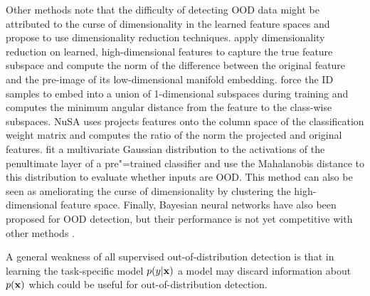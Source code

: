 Other methods note that the difficulty of detecting OOD data might be attributed to the curse of dimensionality in the learned feature spaces and propose to use dimensionality reduction techniques. \textcite{ndiour_outofdistribution_2020} apply dimensionality reduction on learned, high-dimensional features to capture the true feature subspace and compute the norm of the difference between the original feature and the pre-image of its low-dimensional manifold embedding. 
\textcite{zaeemzadeh_outofdistribution_2021} force the ID samples to embed into a union of 1-dimensional subspaces during training and computes the minimum angular distance from the feature to the class-wise subspaces. 
NuSA \parencite{cook_outlier_2020} uses projects features onto the column space of the classification weight matrix and computes the ratio of the norm the projected and original features.
\textcite{lee_simple_2018} fit a multivariate Gaussian distribution to the activations of the penultimate layer of a pre"=trained classifier and use the Mahalanobis distance to this distribution to evaluate whether inputs are OOD. This method can also be seen as ameliorating the curse of dimensionality by clustering the high-dimensional feature space. 
Finally, Bayesian neural networks have also been proposed for OOD detection, but their performance is not yet competitive with other methods \parencite{henning_are_2021,dangelo_outofdistribution_2022,nguyen_out_2022}. 


A general weakness of all supervised out-of-distribution detection is that in learning the task-specific model $p(y|{\mathbf{x}})$ a model may discard information about $p({\mathbf{x}})$ which could be useful for out-of-distribution detection.




